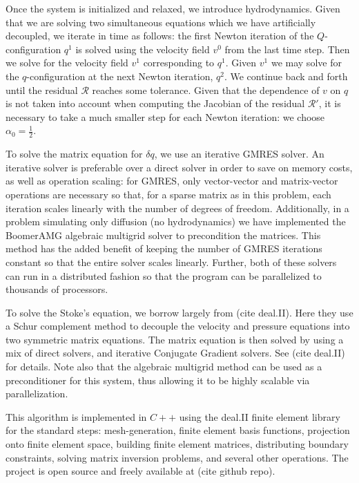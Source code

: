 \documentclass[reqno]{article}
\begin{document}
  Once the system is initialized and relaxed, we introduce hydrodynamics.
  Given that we are solving two simultaneous equations which we have
  artificially decoupled, we iterate in time as follows: the first Newton
  iteration of the $Q$-configuration $q^1$ is solved using the velocity field
  $v^0$ from the last time step.
  Then we solve for the velocity field $v^1$ corresponding to $q^1$.
  Given $v^1$ we may solve for the $q$-configuration at the next Newton
  iteration, $q^2$.
  We continue back and forth until the residual $\mathcal{R}$ reaches some
  tolerance.
  Given that the dependence of $v$ on $q$ is not taken into account when
  computing the Jacobian of the residual $\mathcal{R}'$, it is necessary to take
  a much smaller step for each Newton iteration: we choose $\alpha_0 =
  \tfrac12$.

  To solve the matrix equation for $\delta q$, we use an iterative GMRES solver.
  An iterative solver is preferable over a direct solver in order to save on
  memory costs, as well as operation scaling: for GMRES, only vector-vector and
  matrix-vector operations are necessary so that, for a sparse matrix as in this
  problem, each iteration scales linearly with the number of degrees of freedom.
  Additionally, in a problem simulating only diffusion (no hydrodynamics) we
  have implemented the BoomerAMG algebraic multigrid solver to precondition the
  matrices.
  This method has the added benefit of keeping the number of GMRES iterations
  constant so that the entire solver scales linearly.
  Further, both of these solvers can run in a distributed fashion so that the
  program can be parallelized to thousands of processors.

  To solve the Stoke's equation, we borrow largely from (cite deal.II).
  Here they use a Schur complement method to decouple the velocity and pressure
  equations into two symmetric matrix equations.
  The matrix equation is then solved by using a mix of direct solvers, and
  iterative Conjugate Gradient solvers.
  See (cite deal.II) for details.
  Note also that the algebraic multigrid method can be used as a preconditioner
  for this system, thus allowing it to be highly scalable via parallelization.

  This algorithm is implemented in $C++$ using the deal.II finite element
  library for the standard steps: mesh-generation, finite element basis
  functions, projection onto finite element space, building finite element
  matrices, distributing boundary constraints, solving matrix inversion
  problems, and several other operations.
  The project is open source and freely available at (cite github repo).
  
\end{document}
